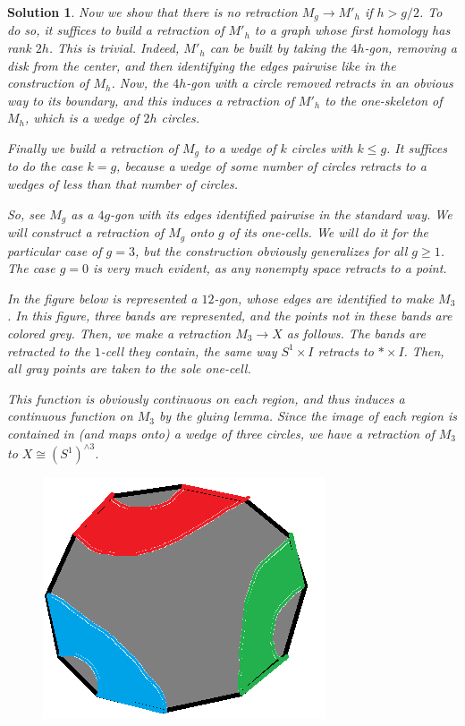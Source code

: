 \documentclass{article}
\theoremstyle{plain}
\theoremstyle{nonumberplain}
\newtheorem{sol}{Solution}
\begin{document}
\begin{sol}
\medskip

Now we show that there is no retraction $M_g \to M'_h$ if $h > g/2$. To do so, it suffices to build a retraction of $M'_h$ to a graph whose first homology has rank $2h$. This is trivial. Indeed, $M'_h$ can be built by taking the $4h$-gon, removing a disk from the center, and then identifying the edges pairwise like in the construction of $M_h$. Now, the $4h$-gon with a circle removed retracts in an obvious way to its boundary, and this induces a retraction of $M'_h$ to the one-skeleton of $M_h$, which is a wedge of $2h$ circles.

\medskip

Finally we build a retraction of $M_g$ to a wedge of $k$ circles with $k \leq g$. It suffices to do the case $k = g$, because a wedge of some number of circles retracts to a wedges of less than that number of circles.

So, see $M_g$ as a $4g$-gon with its edges identified pairwise in the standard way. We will construct a retraction of $M_g$ onto $g$ of its one-cells. We will do it for the particular case of $g = 3$, but the construction obviously generalizes for all $g \geq 1$. The case $g = 0$ is very much evident, as any nonempty space retracts to a point.

In the figure below is represented a $12$-gon, whose edges are identified to make $M_3$. In this figure, three bands are represented, and the points not in these bands are colored grey. Then, we make a retraction $M_3 \to X$ as follows. The bands are retracted to the $1$-cell they contain, the same way $S^1 \times I$ retracts to $* \times I$. Then, all gray points are taken to the sole one-cell.

This function is obviously continuous on each region, and thus induces a continuous function on $M_3$ by the gluing lemma. Since the image of each region is contained in (and maps onto) a wedge of three circles, we have a retraction of $M_3$ to $X \cong (S^1)^{\wedge 3}$.

\begin{figure}[H]
\centering
\includegraphics{final1}
\end{figure}
\end{sol}
\end{document}
